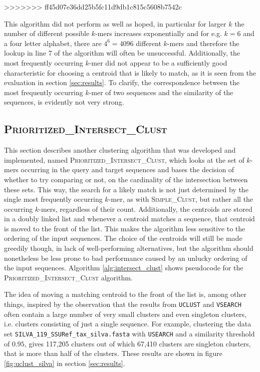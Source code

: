 >>>>>>> ff45d07e36dd25b5fc11d9db1c815c5608b7542c

This algorithm did not perform as well as hoped, in particular for larger $k$
the number of different possible $k$-mers increases exponentially and for e.g.
$k = 6$ and a four letter alphabet, there are $4^6 = 4096$ different $k$-mers
and therefore the lookup in line 7 of the algorithm will often be unsuccessful.
Additionally, the most frequently occurring $k$-mer did not appear to be a
sufficiently good characteristic for choosing a centroid that is likely to
match, as it is seen from the evaluation in section \ref{sec:results}. To
clarify, the correspondence between the most frequently occurring $k$-mer of
two sequences and the similarity of the sequences, is evidently not very strong.


\subsection{\textsc{Prioritized\_Intersect\_Clust}}

This section describes another clustering algorithm that was developed and
implemented, named \textsc{Prioritized\_Intersect\_Clust}, which looks at the
set of $k$-mers occurring in the query and target sequences and bases the
decision of whether to try comparing or not, on the cardinality of the
intersection between these sets. This way, the search for a likely match is not
just determined by the single most frequently occurring $k$-mer, as with
\textsc{Simple\_Clust}, but rather all the occurring $k$-mers, regardless of
their count. Additionally, the centroids are stored in a doubly linked list and
whenever a centroid matches a sequence, that centroid is moved to the front of
the list. This makes the algorithm less sensitive to the ordering of the input
sequences. The choice of the centroids will still be made greedily though, in
lack of well-performing alternatives, but the algorithm should nonetheless be
less prone to bad performance caused by an unlucky ordering of the input
sequences. Algorithm \ref{alg:intersect_clust} shows pseudocode for the
\textsc{Prioritized\_Intersect\_Clust} algorithm.

The idea of moving a matching centroid to the front of the list is, among other
things, inspired by the observation that the results from \texttt{UCLUST} and
\texttt{VSEARCH} often contain a large number of very small clusters and even
singleton clusters, i.e. clusters consisting of just a single sequence. For
example, clustering the data set \texttt{SILVA\_119\_SSURef\_tax\_silva.fasta}
with \texttt{USEARCH} and a similarity threshold of $0.95$, gives 117,205
clusters out of which 67,410 clusters are singleton clusters, that is more than
half of the clusters. These results are shown in figure \ref{fig:uclust_silva}
in section \ref{sec:results}.

